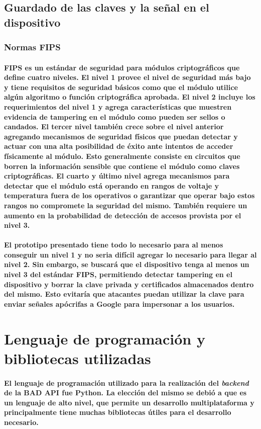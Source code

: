 \documentclass{article}
\begin{document}
\subsection{Guardado de las claves y la señal en el dispositivo}
\subsubsection{Normas FIPS}
\paragraph{
FIPS es un estándar de seguridad para módulos criptográficos que define cuatro niveles. El nivel 1 provee el nivel de seguridad más bajo y tiene requisitos de seguridad básicos como que el módulo utilice algún algoritmo o función criptográfica aprobada. El nivel 2 incluye los requerimientos del nivel 1 y agrega características que muestren evidencia de tampering en el módulo como pueden ser sellos o candados. El tercer nivel también crece sobre el nivel anterior agregando mecanismos de seguridad físicos que puedan detectar y actuar con una alta posibilidad de éxito ante intentos de acceder físicamente al módulo. Esto generalmente consiste en circuitos que borren la información sensible que contiene el módulo como claves criptográficas. El cuarto y último nivel agrega mecanismos para detectar que el módulo está operando en rangos de voltaje y temperatura fuera de los operativos o garantizar que operar bajo estos rangos no compromete la seguridad del mismo. También requiere un aumento en la probabilidad de detección de accesos provista por el nivel 3.
}
\paragraph{
El prototipo presentado tiene todo lo necesario para al menos conseguir un nivel 1 y no seria difícil agregar lo necesario para llegar al nivel 2. Sin embargo, se buscará que el dispositivo tenga al menos un nivel 3 del estándar FIPS, permitiendo detectar tampering en el dispositivo y borrar la clave privada y certificados almacenados dentro del mismo. Esto evitaría que atacantes puedan utilizar la clave para enviar señales apócrifas a Google para impersonar a los usuarios.
}

\section{Lenguaje de programación y bibliotecas utilizadas}
\paragraph{
El lenguaje de programación utilizado para la realización del \textit{backend} de la BAD API fue Python. La elección del mismo se debió a que es un lenguaje de alto nivel, que permite un desarrollo multiplataforma y principalmente tiene muchas bibliotecas útiles para el desarrollo necesario.
}
\end{document}

